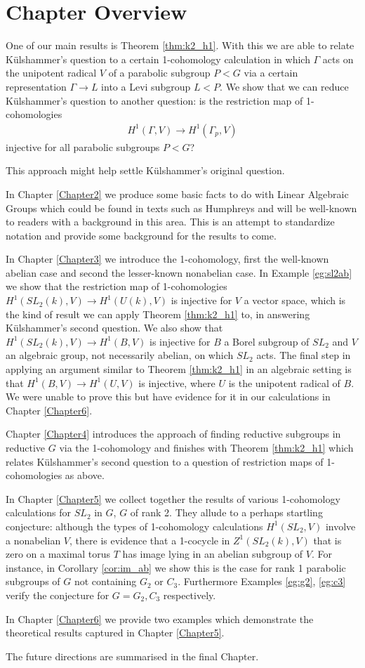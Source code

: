 \section{Chapter Overview}

One of our main results is Theorem \ref{thm:k2_h1}. With this we are able to relate K\"ulshammer's question to a certain 1-cohomology calculation in which $\Gamma$ acts on the unipotent radical $V$ of a parabolic subgroup $P < G$ via a certain representation $\Gamma \rightarrow L$ into a Levi subgroup $L < P$. We show that we can reduce K\"ulshammer's question to another question: is the restriction map of 1-cohomologies
\begin{align}
  H^1(\Gamma, V) \rightarrow H^1(\Gamma_p, V)
\end{align}
injective for all parabolic subgroups $P<G$?

This approach might help settle K\"ulshammer's original question.

In Chapter \ref{Chapter2} we produce some basic facts to do with Linear Algebraic Groups which could be found in texts such as Humphreys \cite{humphreys1975linear} and will be well-known to readers with a background in this area. This is an attempt to standardize notation and provide some background for the results to come.

In Chapter \ref{Chapter3} we introduce the 1-cohomology, first the well-known abelian case and second the lesser-known nonabelian case. In Example \ref{eg:sl2ab} we show that the restriction map of 1-cohomologies $H^1(SL_2(k), V) \rightarrow H^1(U(k), V)$ is injective for $V$ a vector space, which is the kind of result we can apply Theorem \ref{thm:k2_h1} to, in answering K\"ulshammer's second question. We also show that $H^1(SL_2(k), V) \rightarrow H^1(B, V)$ is injective for $B$ a Borel subgroup of $SL_2$ and $V$ an algebraic group, not necessarily abelian, on which $SL_2$ acts. The final step in applying an argument similar to Theorem \ref{thm:k2_h1} in an algebraic setting is that $H^1(B, V) \rightarrow H^1(U, V)$ is injective, where $U$ is the unipotent radical of $B$. We were unable to prove this but have evidence for it in our calculations in Chapter \ref{Chapter6}.

Chapter \ref{Chapter4} introduces the approach of finding reductive subgroups in reductive $G$ via the 1-cohomology and finishes with Theorem \ref{thm:k2_h1} which relates K\"ulshammer's second question to a question of restriction maps of 1-cohomologies as above.

In Chapter \ref{Chapter5} we collect together the results of various 1-cohomology calculations for $SL_2$ in $G$, $G$ of rank 2. They allude to a perhaps startling conjecture: although the types of 1-cohomology calculations $H^1(SL_2, V)$ involve a nonabelian $V$, there is evidence that a 1-cocycle in $Z^1(SL_2(k), V)$ that is zero on a maximal torus $T$ has image lying in an abelian subgroup of $V$. For instance, in Corollary \ref{cor:im_ab} we show this is the case for rank 1 parabolic subgroups of $G$ not containing $G_2$ or $C_3$. Furthermore Examples \ref{eg:g2}, \ref{eg:c3} verify the conjecture for $G = G_2, C_3$ respectively.

In Chapter \ref{Chapter6} we provide two examples which demonstrate the theoretical results captured in Chapter \ref{Chapter5}.

The future directions are summarised in the final Chapter.
